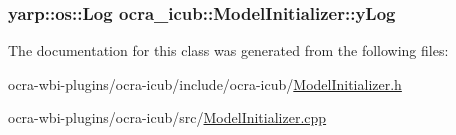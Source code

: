 \hypertarget{classocra__icub_1_1ModelInitializer_a7ecf8156a05245831e51cc212eec5985}{
\subsubsection[{y\-Log}]{\setlength{\rightskip}{0pt plus 5cm}yarp\-::os\-::\-Log {\bf ocra\-\_\-icub\-::\-Model\-Initializer\-::y\-Log}}}\label{classocra__icub_1_1ModelInitializer_a7ecf8156a05245831e51cc212eec5985}


\-The documentation for this class was generated from the following files\-:\begin{DoxyCompactItemize}
\item 
ocra-\/wbi-\/plugins/ocra-\/icub/include/ocra-\/icub/\hyperlink{ModelInitializer_8h}{\-Model\-Initializer.\-h}\item 
ocra-\/wbi-\/plugins/ocra-\/icub/src/\hyperlink{ModelInitializer_8cpp}{\-Model\-Initializer.\-cpp}\end{DoxyCompactItemize}
